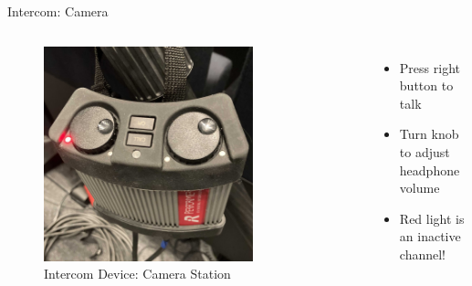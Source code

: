 \begin{frame}{Intercom: Camera}
	\begin{columns}[T,onlytextwidth]
		\begin{figure}
			\centering
			\includegraphics[width=0.75\textwidth]{images/intercom-riedel-beltpack.jpg}
			\caption{Intercom Device: Camera Station}
		\end{figure}

		\begin{itemize}
			\item Press right button to talk
			\item Turn knob to adjust headphone volume
			\item Red light is an inactive channel!
		\end{itemize}
	\end{columns}
\end{frame}
